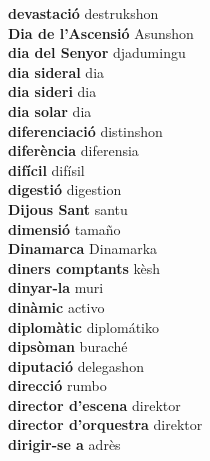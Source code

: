 \textbf{ devastació  } destrukshon \\
\textbf{ Dia de l’Ascensió  } Asunshon \\
\textbf{ dia del Senyor  } djadumingu \\
\textbf{ dia sideral  } dia \\
\textbf{ dia sideri  } dia \\
\textbf{ dia solar  } dia \\
\textbf{ diferenciació  } distinshon \\
\textbf{ diferència  } diferensia \\
\textbf{ difícil  } difísil \\
\textbf{ digestió  } digestion \\
\textbf{ Dijous Sant  } santu \\
\textbf{ dimensió  } tamaño \\
\textbf{ Dinamarca  } Dinamarka \\
\textbf{ diners comptants  } kèsh \\
\textbf{ dinyar-la  } muri \\
\textbf{ dinàmic  } activo \\
\textbf{ diplomàtic  } diplomátiko \\
\textbf{ dipsòman  } buraché \\
\textbf{ diputació  } delegashon \\
\textbf{ direcció  } rumbo \\
\textbf{ director d’escena  } direktor \\
\textbf{ director d’orquestra  } direktor \\
\textbf{ dirigir-se a  } adrès \\
